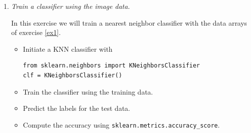 \documentclass[a4paper,12pt]{scrartcl}
\newcommand{\python}{{\fbox{\texttt{\bfseries python}}\quad}}
\begin{document}
\begin{enumerate}
\item \python \emph{Train a classifier using the image data.}

In this exercise we will train a nearest neighbor classifier with the data arrays of exercise \ref{ex1}.

\begin{itemize}
\item Initiate a KNN classifier with 
\begin{lstlisting}
from sklearn.neighbors import KNeighborsClassifier
clf = KNeighborsClassifier()
\end{lstlisting}
\item Train the classifier using the training data.
\item Predict the labels for the test data.
\item Compute the accuracy using \verb+sklearn.metrics.accuracy_score+.
\end{itemize}

\end{enumerate}
\end{document}
